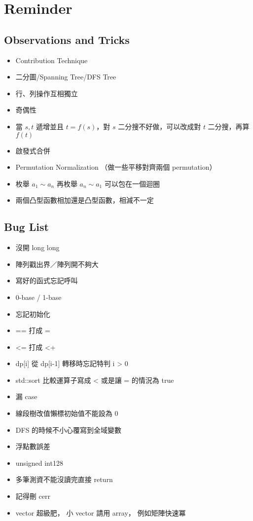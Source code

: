 \documentclass[a4paper,10pt,twocolumn,oneside]{article}
\begin{document}
\renewcommand{\headrulewidth}{0.4pt}
\renewcommand{\contentsname}{Contents} 

\pagestyle{fancy}
\fancyfoot{}
\fancyhead[R]{\thepage}


{\scriptsize
\tableofcontents}



\section{Reminder}

\subsection{Observations and Tricks}
\begin{itemize}[nolistsep]
    \item Contribution Technique
    \item 二分圖/Spanning Tree/DFS Tree
    \item 行、列操作互相獨立
    \item 奇偶性
    \item 當 $s, t$ 遞增並且 $t = f(s)$，對 $s$ 二分搜不好做，可以改成對 $t$ 二分搜，再算 $f(t)$
    \item 啟發式合併
    \item Permutation Normalization （做一些平移對齊兩個 permutation）
    \item 枚舉 $a_1 \sim a_n$ 再枚舉 $a_n \sim a_1$ 可以包在一個迴圈
    \item 兩個凸型函數相加還是凸型函數，相減不一定
\end{itemize}

\subsection{Bug List}
\begin{itemize}[nolistsep]
\item 沒開 long long
\item 陣列戳出界／陣列開不夠大
\item 寫好的函式忘記呼叫
\item 0-base / 1-base
\item 忘記初始化
\item == 打成 =
\item <= 打成 <+
\item dp[i] 從 dp[i-1] 轉移時忘記特判 i > 0
\item std::sort 比較運算子寫成 < 或是讓 = 的情況為 true
\item 漏 case
\item 線段樹改值懶標初始值不能設為 0
\item DFS 的時候不小心覆寫到全域變數
\item 浮點數誤差
\item unsigned int128
\item 多筆測資不能沒讀完直接 return
\item 記得刪 cerr
\item vector 超級肥， 小 vector 請用 array， 例如矩陣快速冪
\end{itemize}
\end{document}
